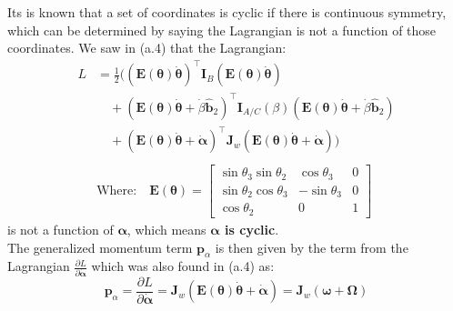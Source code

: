 \documentclass[titlepage]{article}
\begin{document}
\begin{mdframed}[linewidth=1pt, innertopmargin=10pt, innerbottommargin=10pt]
	Its is known that a set of coordinates is cyclic if there is continuous symmetry, which can be determined by saying the Lagrangian is not a function of those coordinates. We saw in (a.4) that the Lagrangian:
	\begin{equation}
		\begin{split}
			L&=\frac{1}{2}\bigg(\left(\boldsymbol{E}(\boldsymbol{\theta})\dot{\boldsymbol{\theta}}\right)^\top\boldsymbol{I}_B\left(\boldsymbol{E}(\boldsymbol{\theta})\dot{\boldsymbol{\theta}}\right) \\
			&\quad+\left(\boldsymbol{E}(\boldsymbol{\theta})\dot{\boldsymbol{\theta}}+\dot{\beta}\hat{\boldsymbol{b}}_2\right)^\top\boldsymbol{I}_{A/C}(\beta)\left(\boldsymbol{E}(\boldsymbol{\theta})\dot{\boldsymbol{\theta}}+\dot{\beta}\hat{\boldsymbol{b}}_2\right) \\
			&\quad+\left(\boldsymbol{E}(\boldsymbol{\theta})\dot{\boldsymbol{\theta}}+\dot{\boldsymbol{\alpha}}\right)^\top\boldsymbol{J}_w\left(\boldsymbol{E}(\boldsymbol{\theta})\dot{\boldsymbol{\theta}}+\dot{\boldsymbol{\alpha}}\right)\bigg) \\
			\\
			&\text{Where:}\quad\boldsymbol{E}(\boldsymbol{\theta})=
			\begin{bmatrix}
				\sin\theta_3\sin\theta_2 & \cos\theta_3 & 0 \\
				\sin\theta_2\cos\theta_3 & -\sin\theta_3 & 0 \\
				\cos\theta_2 & 0 & 1
			\end{bmatrix}
		\end{split}
	\end{equation}
	is not a function of $\boldsymbol{\alpha}$, which means \textbf{$\boldsymbol{\alpha}$ is cyclic}.\\
	
	The generalized momentum term $\boldsymbol{p}_{\alpha}$ is then given by the term from the Lagrangian $\frac{\partial L}{\partial\dot{\boldsymbol{\alpha}}}$ which was also found in (a.4) as:
	\begin{equation}
		\boldsymbol{p}_{\alpha}=\frac{\partial L}{\partial\dot{\boldsymbol{\alpha}}}=\boldsymbol{J}_w\left(\boldsymbol{E}(\boldsymbol{\theta})\dot{\boldsymbol{\theta}}+\dot{\boldsymbol{\alpha}}\right)=\boldsymbol{J}_w\left(\boldsymbol{\omega}+\boldsymbol{\Omega}\right)
	\end{equation}
\end{mdframed}
\end{document}
